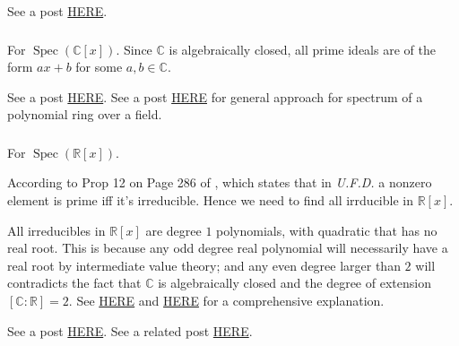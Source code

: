 See a post \href{https://math.stackexchange.com/questions/1258959/prime-ideals-in-a-field}{HERE}. 

\subsubsection{}
For $\operatorname{Spec}(\mathbb C[x])$.
Since $\mathbb C$ is algebraically closed, all prime ideals are of the form $ax+b$ for some $a,b\in\mathbb C$.

See a post \href{https://math.stackexchange.com/questions/838431/studying-operatornamespec-mathbbzx-operatornamespec-mathbbrx}{HERE}.
See a post \href{https://math.stackexchange.com/questions/1856918/comparing-the-prime-spectra-of-mathbbqx-mathbbrx-and-mathbbcx}{HERE} for general approach for spectrum of a polynomial ring over a field.


\subsubsection{}
For $\operatorname{Spec}(\mathbb R[x])$. 

According to Prop 12 on Page 286 of \cite{dummit2004abstract}, which states that in \textit{U.F.D.} a nonzero element is prime iff it's irreducible. 
Hence we need to find all irrducible in $\mathbb R[x]$.

All irreducibles in $\mathbb R[x]$ are degree $1$ polynomials, with quadratic that has no real root. This is because any odd degree real polynomial will necessarily have a real root by intermediate value theory; and any even degree larger than $2$ will contradicts the fact that $\mathbb C$ is algebraically closed and the degree of extension $[\mathbb C:\mathbb R]=2$. See \href{https://math.stackexchange.com/questions/2127249/what-are-the-irreducible-elements-in-mathbbrx-and-mathbbcx}{HERE} and \href{https://math.stackexchange.com/questions/4088566/most-even-degree-polynomials-in-mathbbrx-are-reducible}{HERE} for a comprehensive explanation. 

See a post \href{https://math.stackexchange.com/questions/1057642/describe-the-topology-of-spec-mathbbrx}{HERE}.
See a related post \href{https://math.stackexchange.com/questions/4452569/describe-operatornamespec-mathbbrx-xn}{HERE}. 



\subsubsection{}

